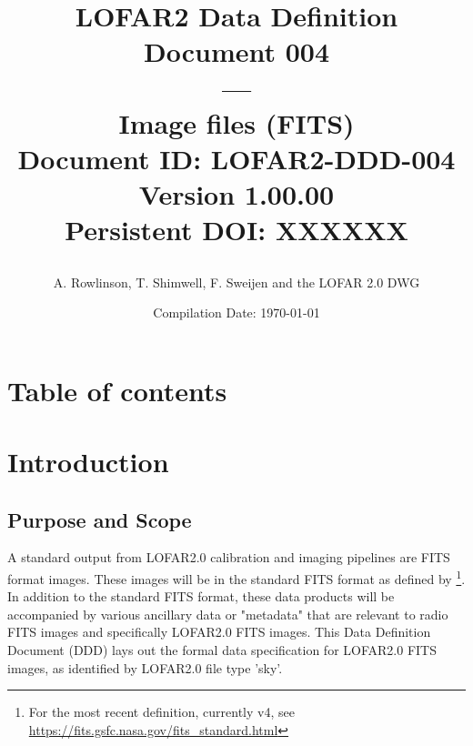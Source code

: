 \documentclass[a4paper,10pt,bibtotoc]{scrartcl}
\begin{document}

\title{LOFAR2 Data Definition Document 004 \\ --- \\ Image files (FITS) \\
{\normalsize Document ID: LOFAR2-DDD-004} \\ 
{\normalsize Version 1.00.00} \\
{\normalsize Persistent DOI: XXXXXX} \\
\author{A. Rowlinson, T. Shimwell, F. Sweijen and the LOFAR 2.0 DWG}
\date{\small{Compilation Date: \today}}}
\maketitle



\section{Table of contents}
\tableofcontents

\listoffigures

\listoftables

\clearpage




\section{Introduction}
\label{sec:introduction}

\subsection{Purpose and Scope}
\label{sec:purpose and scope}

A standard output from LOFAR2.0 calibration and imaging pipelines are FITS format images. These images will be in the standard FITS format as defined by \cite{FITSv3.0}\footnote{For the most recent definition, currently v4, see \url{https://fits.gsfc.nasa.gov/fits_standard.html}}. In addition to the standard FITS format, these data products will be accompanied by various ancillary data or "metadata" that are relevant to radio FITS images and specifically LOFAR2.0 FITS images. This Data Definition Document (DDD) lays out the formal data specification for LOFAR2.0 FITS images, as identified by LOFAR2.0 file type 'sky'.
\end{document}
